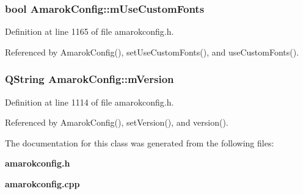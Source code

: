 \subsubsection{\setlength{\rightskip}{0pt plus 5cm}bool {\bf Amarok\-Config::m\-Use\-Custom\-Fonts}\hspace{0.3cm}{\tt  [protected]}}\label{classAmarokConfig_AmarokConfigp45}




Definition at line 1165 of file amarokconfig.h.

Referenced by Amarok\-Config(), set\-Use\-Custom\-Fonts(), and use\-Custom\-Fonts().
\subsubsection{\setlength{\rightskip}{0pt plus 5cm}QString {\bf Amarok\-Config::m\-Version}\hspace{0.3cm}{\tt  [protected]}}\label{classAmarokConfig_AmarokConfigp0}




Definition at line 1114 of file amarokconfig.h.

Referenced by Amarok\-Config(), set\-Version(), and version().

The documentation for this class was generated from the following files:\begin{CompactItemize}
\item 
{\bf amarokconfig.h}\item 
{\bf amarokconfig.cpp}\end{CompactItemize}
